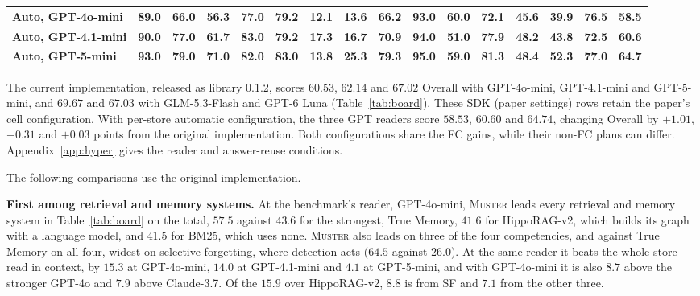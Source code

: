 \documentclass{article}
\newcommand{\ours}{\rowcolor{oursbg}}
\newlength{\mw}\newlength{\cw}
\newcommand{\sys}{\textsc{Muster}}
\begin{document}
\begin{table}[t]
\begin{tabular}{@{}>{\raggedright\arraybackslash}p{\mw}*{15}{>{\centering\arraybackslash}p{\cw}}@{}}
\ours \textbf{Auto, GPT-4o-mini} & \textbf{89.0} & \textbf{66.0} & \textbf{56.3} & \textbf{77.0} & \textbf{79.2} & \textbf{12.1} & \textbf{13.6} & \textbf{66.2} & \textbf{93.0} & \textbf{60.0} & \textbf{72.1} & \textbf{45.6} & \textbf{39.9} & \textbf{76.5} & \textbf{58.5} \\
\ours \textbf{Auto, GPT-4.1-mini} & \textbf{90.0} & \textbf{77.0} & \textbf{61.7} & \textbf{83.0} & \textbf{79.2} & \textbf{17.3} & \textbf{16.7} & \textbf{70.9} & \textbf{94.0} & \textbf{51.0} & \textbf{77.9} & \textbf{48.2} & \textbf{43.8} & \textbf{72.5} & \textbf{60.6} \\
\ours \textbf{Auto, GPT-5-mini} & \textbf{93.0} & \textbf{79.0} & \textbf{71.0} & \textbf{82.0} & \textbf{83.0} & \textbf{13.8} & \textbf{25.3} & \textbf{79.3} & \textbf{95.0} & \textbf{59.0} & \textbf{81.3} & \textbf{48.4} & \textbf{52.3} & \textbf{77.0} & \textbf{64.7} \\
\bottomrule
\end{tabular}
\end{table}

The current implementation, released as library 0.1.2, scores $60.53$, $62.14$ and $67.02$ Overall with GPT-4o-mini, GPT-4.1-mini and GPT-5-mini, and $69.67$ and $67.03$ with GLM-5.3-Flash and GPT-6 Luna (Table~\ref{tab:board}). These SDK (paper settings) rows retain the paper's cell configuration. With per-store automatic configuration, the three GPT readers score $58.53$, $60.60$ and $64.74$, changing Overall by $+1.01$, $-0.31$ and $+0.03$ points from the original implementation. Both configurations share the FC gains, while their non-FC plans can differ. Appendix~\ref{app:hyper} gives the reader and answer-reuse conditions.

The following comparisons use the original implementation.

\textbf{First among retrieval and memory systems.} At the benchmark's reader, GPT-4o-mini, \sys{} leads every retrieval and memory system in
Table~\ref{tab:board} on the total, $57.5$ against $43.6$ for the strongest, True Memory, $41.6$ for HippoRAG-v2, which builds its graph with a language model, and $41.5$ for BM25, which uses none. \sys{} also leads on three of the four competencies, and against True Memory on all four, widest on selective forgetting, where detection acts ($64.5$ against $26.0$). At the
same reader it beats the whole store read in context, by $15.3$ at GPT-4o-mini, $14.0$ at GPT-4.1-mini and
$4.1$ at GPT-5-mini, and with GPT-4o-mini it is also $8.7$ above the stronger GPT-4o and $7.9$ above Claude-3.7. Of the $15.9$ over HippoRAG-v2, $8.8$ is from SF and $7.1$ from the other three.
\end{document}
